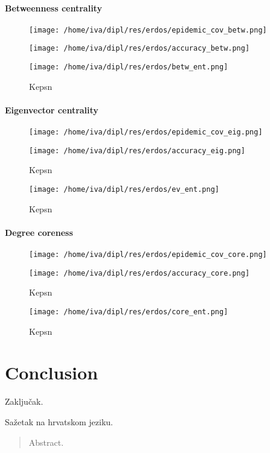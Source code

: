 \documentclass[times, utf8, diplomski]{fer}
\begin{document}
\subsubsection{Betweenness centrality}
\begin{figure}[H]
\texttt{[image: /home/iva/dipl/res/erdos/epidemic\_cov\_betw.png]}
\end{figure}
\begin{figure}[H]
\texttt{[image: /home/iva/dipl/res/erdos/accuracy\_betw.png]}
\end{figure}
\begin{figure}[H]
\texttt{[image: /home/iva/dipl/res/erdos/betw\_ent.png]}
\caption{Kepsn}
\end{figure}

\subsubsection{Eigenvector centrality}
\begin{figure}[H]
\texttt{[image: /home/iva/dipl/res/erdos/epidemic\_cov\_eig.png]}
\end{figure}
\begin{figure}[H]
\texttt{[image: /home/iva/dipl/res/erdos/accuracy\_eig.png]}
\caption{Kepsn}
\end{figure}
\begin{figure}[H]
\texttt{[image: /home/iva/dipl/res/erdos/ev\_ent.png]}
\caption{Kepsn}
\end{figure}

\subsubsection{Degree coreness}
\begin{figure}[H]
\texttt{[image: /home/iva/dipl/res/erdos/epidemic\_cov\_core.png]}
\end{figure}
\begin{figure}[H]
\texttt{[image: /home/iva/dipl/res/erdos/accuracy\_core.png]}
\caption{Kepsn}
\end{figure}
\begin{figure}[H]
\texttt{[image: /home/iva/dipl/res/erdos/core\_ent.png]}
\caption{Kepsn}
\end{figure}


\chapter{Conclusion}
Zaključak.


%


\begin{sazetak}
Sažetak na hrvatskom jeziku.

\end{sazetak}

\begin{abstract}
Abstract.

\end{abstract}
\end{document}
